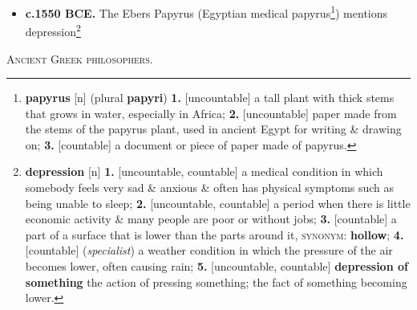 \documentclass[oneside]{book}
\numberwithin{equation}{section}
\begin{document}
\begin{itemize}
	\item \textbf{c.1550 BCE.} The Ebers Papyrus (Egyptian medical papyrus\footnote{\textbf{papyrus} [n] (plural \textbf{papyri}) \textbf{1.} [uncountable] a tall plant with thick stems that grows in water, especially in Africa; \textbf{2.} [uncountable] paper made from the stems of the papyrus plant, used in ancient Egypt for writing \& drawing on; \textbf{3.} [countable] a document or piece of paper made of papyrus.}) mentions depression\footnote{\textbf{depression} [n] \textbf{1.} [uncountable, countable] a medical condition in which somebody feels very sad \& anxious \& often has physical symptoms such as being unable to sleep; \textbf{2.} [uncountable, countable] a period when there is little economic activity \& many people are poor or without jobs; \textbf{3.} [countable] a part of a surface that is lower than the parts around it, \textsc{synonym}: \textbf{hollow}; \textbf{4.} [countable] (\textit{specialist}) a weather condition in which the pressure of the air becomes lower, often causing rain; \textbf{5.} [uncountable, countable] \textbf{depression of something} the action of pressing something; the fact of something becoming lower.}
\end{itemize}
\textsc{Ancient Greek philosophers.}
\end{document}
